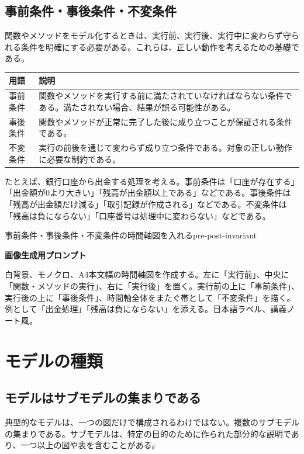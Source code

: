 \documentclass[a4paper,11pt]{ltjsarticle}
\newcommand{\prompt}[1]{\par\noindent\textbf{画像生成用プロンプト}\par\small #1\normalsize}
\begin{document}
\subsection{事前条件・事後条件・不変条件}
関数やメソッドをモデル化するときは、実行前、実行後、実行中に変わらず守られる条件を明確にする必要がある。これらは、正しい動作を考えるための基礎である。

\begin{longtable}{>{\raggedright\arraybackslash}p{}>{\raggedright\arraybackslash}p{}}
\toprule
\textbf{用語} & \textbf{説明} \\
\midrule
事前条件 & 関数やメソッドを実行する前に満たされていなければならない条件である。満たされない場合、結果が誤る可能性がある。\\
事後条件 & 関数やメソッドが正常に完了した後に成り立つことが保証される条件である。\\
不変条件 & 実行の前後を通じて変わらず成り立つ条件である。対象の正しい動作に必要な制約である。\\
\bottomrule
\end{longtable}

たとえば、銀行口座から出金する処理を考える。事前条件は「口座が存在する」「出金額が0より大きい」「残高が出金額以上である」などである。事後条件は「残高が出金額だけ減る」「取引記録が作成される」などである。不変条件は「残高は負にならない」「口座番号は処理中に変わらない」などである。

\begin{todobox}{事前条件・事後条件・不変条件の時間軸図を入れる}{pre-post-invariant}
\prompt{白背景、モノクロ、A4本文幅の時間軸図を作成する。左に「実行前」、中央に「関数・メソッドの実行」、右に「実行後」を置く。実行前の上に「事前条件」、実行後の上に「事後条件」、時間軸全体をまたぐ帯として「不変条件」を描く。例として「出金処理」「残高は負にならない」を添える。日本語ラベル、講義ノート風。}
\end{todobox}

\section{モデルの種類}
\subsection{モデルはサブモデルの集まりである}
典型的なモデルは、一つの図だけで構成されるわけではない。複数のサブモデルの集まりである。サブモデルは、特定の目的のために作られた部分的な説明であり、一つ以上の図や表を含むことがある。
\end{document}
